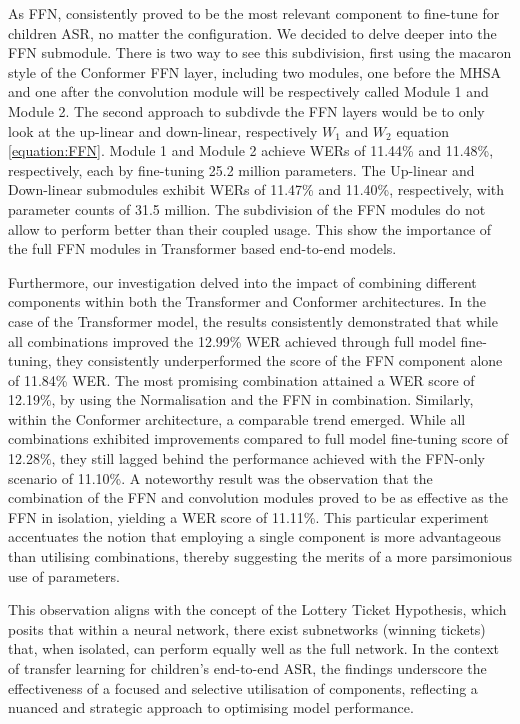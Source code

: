 As \ac{FFN}, consistently proved to be the most relevant component to fine-tune for children \ac{ASR}, no matter the configuration. We decided to delve deeper into the \ac{FFN} submodule. There is two way to see this subdivision, first using the macaron style of the Conformer \ac{FFN} layer, including two modules, one before the \ac{MHSA} and one after the convolution module will be respectively called Module 1 and Module 2. The second approach to subdivde the \ac{FFN} layers would be to only look at the up-linear and down-linear, respectively $W_1$ and $W_2$ equation \ref{equation:FFN}. Module 1 and Module 2 achieve \acp{WER} of 11.44\% and 11.48\%, respectively, each by fine-tuning 25.2 million parameters. The Up-linear and Down-linear  submodules exhibit \acp{WER} of 11.47\% and 11.40\%, respectively, with parameter counts of 31.5 million. The subdivision of the \ac{FFN} modules do not allow to perform better than their coupled usage. This show the importance of the full \ac{FFN} modules in Transformer based end-to-end models. 

Furthermore, our investigation delved into the impact of combining different components within both the Transformer and Conformer architectures. In the case of the Transformer model, the results consistently demonstrated that while all combinations improved the 12.99\% \ac{WER} achieved through full model fine-tuning, they consistently underperformed the score of the \ac{FFN} component alone of 11.84\% \ac{WER}. The most promising combination attained a \ac{WER} score of 12.19\%, by using the Normalisation and the \ac{FFN} in combination.
Similarly, within the Conformer architecture, a comparable trend emerged. While all combinations exhibited improvements compared to full model fine-tuning score of 12.28\%, they still lagged behind the performance achieved with the \ac{FFN}-only scenario of 11.10\%. A noteworthy result was the observation that the combination of the \ac{FFN} and convolution modules proved to be as effective as the \ac{FFN} in isolation, yielding a \ac{WER} score of 11.11\%. This particular experiment accentuates the notion that employing a single component is more advantageous than utilising combinations, thereby suggesting the merits of a more parsimonious use of parameters.

This observation aligns with the concept of the Lottery Ticket Hypothesis, which posits that within a neural network, there exist subnetworks (winning tickets) that, when isolated, can perform equally well as the full network. In the context of transfer learning for children's end-to-end \ac{ASR}, the findings underscore the effectiveness of a focused and selective utilisation of components, reflecting a nuanced and strategic approach to optimising model performance.

